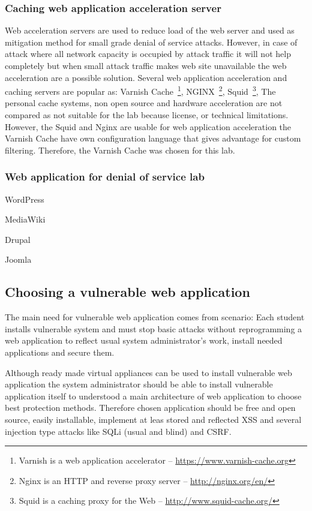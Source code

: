 \subsubsection{Caching web application acceleration server}
Web acceleration servers are used to reduce load of the web server and used as mitigation method for small grade denial of service attacks. However, in case of attack where all network capacity is occupied by attack traffic it will not help completely but when small attack traffic makes web site unavailable the web acceleration are a possible solution. Several web application acceleration and caching servers are popular as: Varnish Cache~\footnote{Varnish is a web application accelerator -- \url{https://www.varnish-cache.org}}, NGINX~\footnote{Nginx is an HTTP and reverse proxy server -- \url{http://nginx.org/en/}}, Squid~\footnote{Squid is a caching proxy for the Web -- \url{http://www.squid-cache.org/}},
The personal cache systems, non open source and hardware acceleration are not compared as not suitable for the lab because license, or technical limitations.
However, the Squid and Nginx are usable for web application acceleration the Varnish Cache have own configuration language that gives advantage for custom filtering. Therefore, the Varnish Cache was chosen for this lab.

\subsubsection{Web application for denial of service lab}
WordPress

MediaWiki

Drupal

Joomla

\subsection{Choosing a vulnerable web application}

The main need for vulnerable web application comes from scenario: Each student installs vulnerable system and must stop basic attacks without reprogramming a web application to reflect usual system administrator's work,  install needed applications and secure them.

Although ready made virtual appliances can be used to install vulnerable web application the
system administrator should be able to install vulnerable application itself to understood a main architecture of web application to choose best protection methods. Therefore chosen application should be free and open source, easily installable, implement at leas stored and reflected \gls{XSS} and several injection type attacks like \gls{SQLi} (usual and blind) and \gls{CSRF}.

